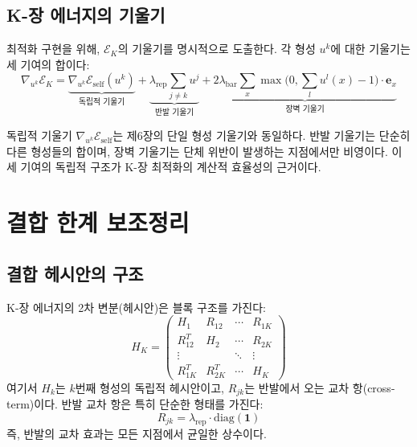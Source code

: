 \subsection{K-장 에너지의 기울기}

최적화 구현을 위해, $\mathcal{E}_K$의 기울기를 명시적으로 도출한다. 각 형성 $u^k$에 대한 기울기는 세 기여의 합이다:
\begin{equation}
    \nabla_{u^k} \mathcal{E}_K = \underbrace{\nabla_{u^k} \mathcal{E}_{\mathrm{self}}(u^k)}_{\text{독립적 기울기}} + \underbrace{\lambda_{\mathrm{rep}} \sum_{j \neq k} u^j}_{\text{반발 기울기}} + \underbrace{2\lambda_{\mathrm{bar}} \sum_x \max\!\big(0, \sum_l u^l(x) - 1\big) \cdot \mathbf{e}_x}_{\text{장벽 기울기}}
    \label{eq:k-field-gradient}
\end{equation}

독립적 기울기 $\nabla_{u^k} \mathcal{E}_{\mathrm{self}}$는 제6장의 단일 형성 기울기와 동일하다. 반발 기울기는 단순히 다른 형성들의 합이며, 장벽 기울기는 단체 위반이 발생하는 지점에서만 비영이다. 이 세 기여의 독립적 구조가 K-장 최적화의 계산적 효율성의 근거이다.


\section{결합 한계 보조정리}
\label{sec:coupling-bound}

\subsection{결합 헤시안의 구조}

K-장 에너지의 2차 변분(헤시안)은 블록 구조를 가진다:
\begin{equation}
    H_K = \begin{pmatrix}
        H_1 & R_{12} & \cdots & R_{1K} \\
        R_{12}^T & H_2 & \cdots & R_{2K} \\
        \vdots & & \ddots & \vdots \\
        R_{1K}^T & R_{2K}^T & \cdots & H_K
    \end{pmatrix}
    \label{eq:joint-hessian}
\end{equation}
여기서 $H_k$는 $k$번째 형성의 독립적 헤시안이고, $R_{jk}$는 반발에서 오는 교차 항(cross-term)이다. 반발 교차 항은 특히 단순한 형태를 가진다:
\begin{equation}
    R_{jk} = \lambda_{\mathrm{rep}} \cdot \mathrm{diag}(\mathbf{1})
    \label{eq:cross-term}
\end{equation}
즉, 반발의 교차 효과는 모든 지점에서 균일한 상수이다.

